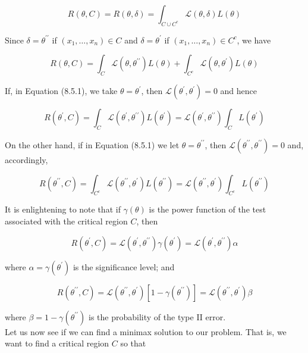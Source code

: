 $$
R(\theta, C)=R(\theta, \delta)=\int_{C \cup C^{c}} \mathcal{L}(\theta, \delta) L(\theta)
$$

Since $\delta=\theta^{\prime \prime}$ if $\left(x_{1}, \ldots, x_{n}\right) \in C$ and $\delta=\theta^{\prime}$ if $\left(x_{1}, \ldots, x_{n}\right) \in C^{c}$, we have


\begin{equation*}
R(\theta, C)=\int_{C} \mathcal{L}\left(\theta, \theta^{\prime \prime}\right) L(\theta)+\int_{C^{c}} \mathcal{L}\left(\theta, \theta^{\prime}\right) L(\theta) \tag{8.5.1}
\end{equation*}


If, in Equation (8.5.1), we take $\theta=\theta^{\prime}$, then $\mathcal{L}\left(\theta^{\prime}, \theta^{\prime}\right)=0$ and hence

$$
R\left(\theta^{\prime}, C\right)=\int_{C} \mathcal{L}\left(\theta^{\prime}, \theta^{\prime \prime}\right) L\left(\theta^{\prime}\right)=\mathcal{L}\left(\theta^{\prime}, \theta^{\prime \prime}\right) \int_{C} L\left(\theta^{\prime}\right)
$$

On the other hand, if in Equation (8.5.1) we let $\theta=\theta^{\prime \prime}$, then $\mathcal{L}\left(\theta^{\prime \prime}, \theta^{\prime \prime}\right)=0$ and, accordingly,

$$
R\left(\theta^{\prime \prime}, C\right)=\int_{C^{c}} \mathcal{L}\left(\theta^{\prime \prime}, \theta^{\prime}\right) L\left(\theta^{\prime \prime}\right)=\mathcal{L}\left(\theta^{\prime \prime}, \theta^{\prime}\right) \int_{C^{c}} L\left(\theta^{\prime \prime}\right)
$$

It is enlightening to note that if $\gamma(\theta)$ is the power function of the test associated with the critical region $C$, then

$$
R\left(\theta^{\prime}, C\right)=\mathcal{L}\left(\theta^{\prime}, \theta^{\prime \prime}\right) \gamma\left(\theta^{\prime}\right)=\mathcal{L}\left(\theta^{\prime}, \theta^{\prime \prime}\right) \alpha
$$

where $\alpha=\gamma\left(\theta^{\prime}\right)$ is the significance level; and

$$
R\left(\theta^{\prime \prime}, C\right)=\mathcal{L}\left(\theta^{\prime \prime}, \theta^{\prime}\right)\left[1-\gamma\left(\theta^{\prime \prime}\right)\right]=\mathcal{L}\left(\theta^{\prime \prime}, \theta^{\prime}\right) \beta
$$

where $\beta=1-\gamma\left(\theta^{\prime \prime}\right)$ is the probability of the type II error.\\
Let us now see if we can find a minimax solution to our problem. That is, we want to find a critical region $C$ so that

